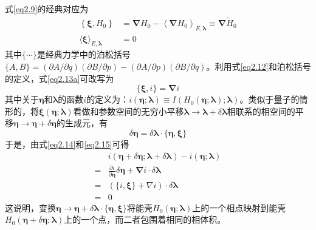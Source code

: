 式\ref{eq2.9}的经典对应为\cite{Jarzynski1995}
\begin{subequations}
    \begin{align}
        \left\{\boldsymbol{\xi}, H_{0}\right\} &=\boldsymbol{\nabla} H_{0}-\left\langle\boldsymbol{\nabla} H_{0}\right\rangle_{E, \boldsymbol{\lambda}} \equiv \boldsymbol{\nabla} \tilde{H}_{0}    \label{eq2.13a}\\
        \langle\boldsymbol{\xi}\rangle_{E, \boldsymbol{\lambda}} &=0 \label{eq2.13b}
    \end{align}
    \label{eq2.13}
\end{subequations}
其中$\{ \cdots \}$是经典力学中的泊松括号$\{A, B\}=(\partial A / \partial q)(\partial B / \partial p)-(\partial A / \partial p)(\partial B / \partial q)$。利用式\ref{eq2.12}和泊松括号的定义，式\ref{eq2.13a}可改写为
\begin{equation}
    \{\boldsymbol{\xi}, i\}=\boldsymbol{\nabla} i
  \label{eq2.14}
\end{equation}
其中关于$\bm{\eta}$和$\bm{\lambda}$的函数$i$的定义为：$i (\bm{\eta}; \bm{\lambda}) \equiv I \left( H_0\left( \bm{\eta}; \bm{\lambda}\right) ; \bm{\lambda} \right)$。类似于量子的情形的，将$\boldsymbol{\xi} (\bm{\eta}; \bm{\lambda})$看做和参数空间的无穷小平移$\boldsymbol{\lambda} \to \boldsymbol{\lambda} + \delta \boldsymbol{\lambda}$相联系的相空间的平移$\bm{\eta} \to \bm{\eta} + \delta \bm{\eta}$的生成元，有\cite{H.1986}
\begin{equation}
    \delta \bm{\eta}=\delta \boldsymbol{\lambda} \cdot\{\bm{\eta}, \boldsymbol{\xi}\}
  \label{eq2.15}
\end{equation}
于是，由式\ref{eq2.14}和\ref{eq2.15}可得
\begin{equation}
    \begin{split}
        &i(\bm{\eta}+\delta \bm{\eta} ; \boldsymbol{\lambda}+\delta \boldsymbol{\lambda})-i(\bm{\eta} ; \boldsymbol{\lambda}) \\
        =&\frac{\partial i}{\partial \bm{\eta}} \delta \bm{\eta}+\boldsymbol{\nabla} i \cdot \delta \boldsymbol{\lambda} \\
        =&(\{i, \boldsymbol{\xi}\}+\nabla i) \cdot \delta \boldsymbol{\lambda}\\
        =&0
    \end{split}
    \label{eq2.16}
\end{equation}
这说明，变换$\bm{\eta} \to \bm{\eta} + \delta  \bm{\lambda} \cdot \{\bm{\eta}, \boldsymbol{\xi}\}$将能壳$H_{0}(\bm{\eta} ; \boldsymbol{\lambda})$上的一个相点映射到能壳$H_{0}(\bm{\eta} + \delta \bm{\eta} ; \boldsymbol{\lambda})$上的一个点，而二者包围着相同的相体积。

